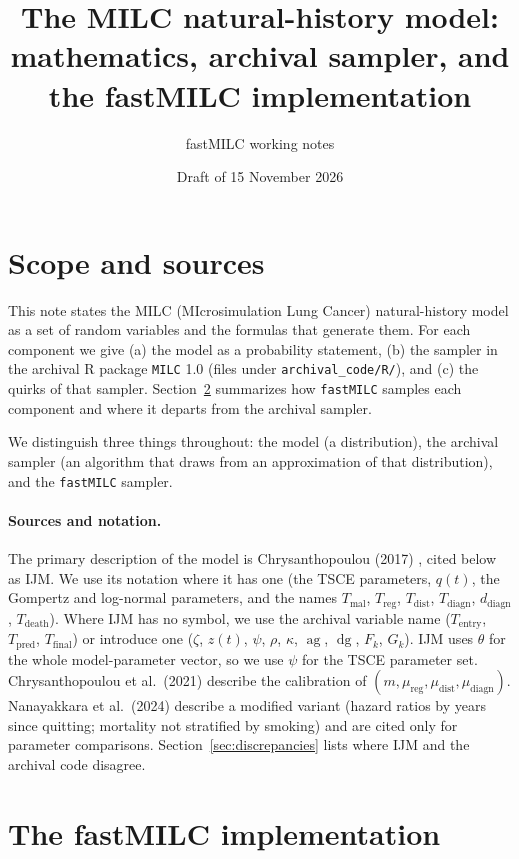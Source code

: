 \documentclass[11pt]{article}
\title{The MILC natural-history model:\\ mathematics, archival sampler, and the fastMILC implementation}
\author{fastMILC working notes}
\date{Draft of 15 November 2026}
\newcommand{\code}[1]{\texttt{#1}}
\newcommand{\ag}{\operatorname{ag}}
\newcommand{\dg}{\operatorname{dg}}
\newcommand{\Tentry}{T_{\mathrm{entry}}}
\newcommand{\Tmal}{T_{\mathrm{mal}}}
\newcommand{\Treg}{T_{\mathrm{reg}}}
\newcommand{\Tdist}{T_{\mathrm{dist}}}
\newcommand{\Tdiagn}{T_{\mathrm{diagn}}}
\newcommand{\Tdeath}{T_{\mathrm{death}}}
\newcommand{\Tpred}{T_{\mathrm{pred}}}
\newcommand{\Tfinal}{T_{\mathrm{final}}}
\begin{document}
\maketitle

\section{Scope and sources}

This note states the MILC (MIcrosimulation Lung Cancer) natural-history model
as a set of random variables and the formulas that generate them. For each
component we give (a) the model as a probability statement, (b) the sampler in
the archival R package \code{MILC} 1.0 \cite{milc2014} (files under
\code{archival\_code/R/}), and (c) the quirks of that sampler.
Section~\ref{sec:fastmilc} summarizes how \code{fastMILC} samples each component
and where it departs from the archival sampler.

We distinguish three things throughout: the model (a distribution), the archival
sampler (an algorithm that draws from an approximation of that distribution),
and the \code{fastMILC} sampler.

\paragraph{Sources and notation.} The primary description of the model is
Chrysanthopoulou (2017) \cite{ijm2017}, cited below as IJM. We use its notation
where it has one (the TSCE parameters, $q(t)$, the Gompertz and log-normal
parameters, and the names $\Tmal$, $\Treg$, $\Tdist$, $\Tdiagn$,
$d_{\mathrm{diagn}}$, $\Tdeath$). Where IJM has no symbol, we use the
archival variable name ($\Tentry$, $\Tpred$, $\Tfinal$) or introduce one
($\zeta$, $z(t)$, $\psi$, $\rho$, $\kappa$, $\ag$, $\dg$, $F_k$, $G_k$).
IJM uses $\theta$ for the whole model-parameter vector, so we use $\psi$ for the
TSCE parameter set. Chrysanthopoulou et al.\ (2021) \cite{mdm2021} describe the
calibration of $(m,\mu_{\mathrm{reg}},\mu_{\mathrm{dist}},\mu_{\mathrm{diagn}})$.
Nanayakkara et al.\ (2024) \cite{nz2024} describe a modified variant (hazard
ratios by years since quitting; mortality not stratified by smoking) and are
cited only for parameter comparisons. Section~\ref{sec:discrepancies} lists
where IJM and the archival code disagree.

\section{The fastMILC implementation}\label{sec:fastmilc}
\end{document}
